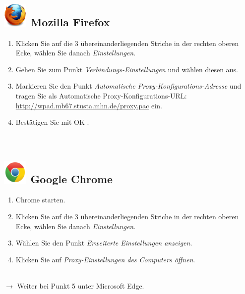 \documentclass[a4paper,12pt]{scrartcl}
\begin{document}
\subsection*{\includegraphics[height=1.2cm,keepaspectratio]{Bilder/Firefox_35_logo} Mozilla Firefox}
\begin{enumerate}
	\item Klicken Sie auf die 3 übereinanderliegenden Striche in der rechten oberen Ecke, wählen Sie danach \emph{Einstellungen}.
	\item Gehen Sie zum Punkt \emph{Verbindungs-Einstellungen} und wählen diesen aus.
	\item Markieren Sie den Punkt \emph{Automatische Proxy-Konfigurations-Adresse} und tragen Sie als Automatische Proxy-Konfigurations-URL: \\ \url{http://wpad.mb67.stusta.mhn.de/proxy.pac} ein.
	\item Bestätigen Sie mit OK .\\
	\\
	\\
\end{enumerate}




\subsection*{\includegraphics[height=1.2cm,keepaspectratio]{Bilder/Chrome_2011_logo} Google Chrome}
\begin{enumerate}
	\item Chrome starten.
	\item Klicken Sie auf die 3 übereinanderliegenden Striche in der rechten oberen Ecke, wählen Sie danach \emph{Einstellungen}.
	\item Wählen Sie den Punkt \emph{Erweiterte Einstellungen anzeigen}.
	\item Klicken Sie auf \emph{Proxy-Einstellungen des Computers öffnen}.
	\\
	\\
\end{enumerate}
$\rightarrow$ Weiter bei Punkt 5 unter Microsoft Edge.
\end{document}
